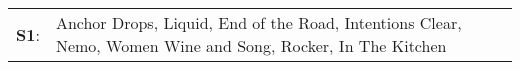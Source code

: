 \begin{supertabular}{p{0.03\textwidth}p{0.92\textwidth}}
 \textbf{S1}:  &  Anchor Drops\textsuperscript{}, \enspace Liquid\textsuperscript{}, \enspace End of the Road\textsuperscript{}, \enspace Intentions Clear\textsuperscript{}, \enspace Nemo\textsuperscript{}, \enspace Women Wine and Song\textsuperscript{}, \enspace Rocker\textsuperscript{}, \enspace In The Kitchen\textsuperscript{}  \enspace  \\
\end{supertabular}
